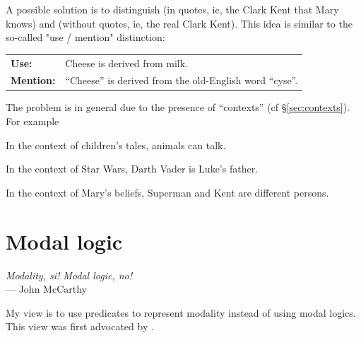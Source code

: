 A possible solution is to distinguish  (in quotes, ie, the Clark Kent that Mary knows) and  (without quotes, ie, the real Clark Kent).  This idea is similar to the so-called "use / mention" distinction:\\
\tab \begin{tabular}{ll}
\textbf{Use:}      & Cheese is derived from milk.\\
\textbf{Mention:}  & ``Cheese'' is derived from the old-English word ``cyse''.
\end{tabular}


The problem is in general due to the presence of ``contexts'' (cf \S\ref{sec:contexts}).  For example
\begin{compactitem-}
\item In the context of children's tales, animals can talk.
\item In the context of Star Wars, Darth Vader is Luke's father.
\item In the context of Mary's beliefs, Superman and Kent are different persons.
\end{compactitem-}

\section{Modal logic}
\begin{flushright}
\emph{Modality, si! Modal logic, no!}\\
--- John McCarthy
\end{flushright}

My view is to use predicates to represent modality instead of using modal logics.  This view was first advocated by \citep*{McCarthy1997}.

